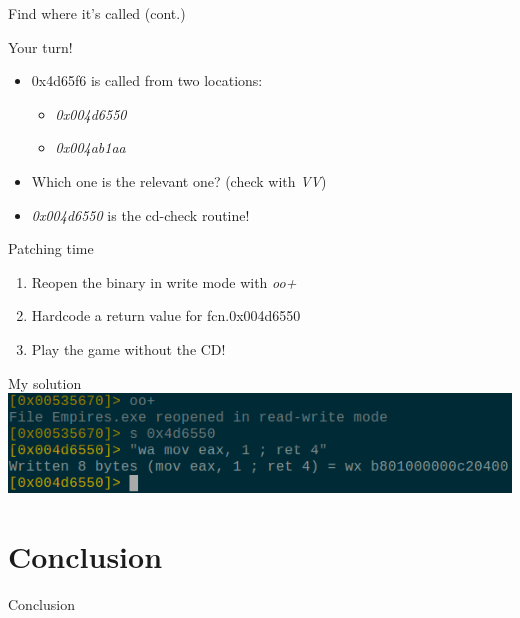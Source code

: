\documentclass{beamer}
\begin{document}
\begin{frame}{Find where it's called (cont.)}
	\begin{block}{Your turn!}
		\begin{itemize}[<+->]
			\item \alert{0x4d65f6} is called from two locations:
				\begin{itemize}
					\item \emph{0x004d6550}
					\item \emph{0x004ab1aa}
				\end{itemize}
			\item Which one is the relevant one? (check with \emph{VV})
			\item \emph{0x004d6550} is the cd-check routine!
		\end{itemize}
	\end{block}
\end{frame}

\begin{frame}{Patching time}
	\begin{enumerate}
		\item Reopen the binary in \alert{write} mode with \emph{oo+}
		\item Hardcode a return value for \alert{fcn.0x004d6550}
		\item Play the game without the CD!
	\end{enumerate}
\end{frame}

\begin{frame}{My solution}
	\includegraphics[width=\textwidth,height=.3\textheight]{crack.png}
\end{frame}

\section*{Conclusion}
\begin{frame}{Conclusion}
	\begin{center}
	\end{center}
\end{frame}
\end{document}
